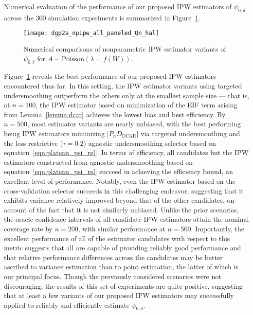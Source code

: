 Numerical evaluation of the performance of our proposed IPW estimators of
$\psi_{0,\delta}$ across the $300$ simulation experiments is summarized in
Figure~\ref{fig:dgp2a_npipw}.
\begin{figure}[H]
  \centering
  \texttt{[image: dgp2a\_npipw\_all\_paneled\_Qn\_hal]}
  \caption{Numerical comparisons of nonparametric IPW estimator variants of
       $\psi_{0,\delta}$ for $A \sim \text{Poisson}(\lambda = f(W))$.}
  \label{fig:dgp2a_npipw}
\end{figure}
Figure~\ref{fig:dgp2a_npipw} reveals the best performance of our proposed IPW
estimators encountered thus far. In this setting, the IPW estimator variants
using targeted undersmoothing outperform the others only at the smallest sample
size --- that is, at $n=100$, the IPW estimator based on minimization of the
EIF term arising from Lemma~\ref{lemma:dcar} achieves the lowest bias and best
efficiency. By $n=500$, most estimator variants are nearly unbiased, with the
best performing being IPW estimators minimizing $\lvert P_n D_\text{DCAR}
\rvert$ via targeted undersmoothing and the less restrictive ($\tau = 0.2$)
agnostic undersmoothing selector based on equation~\ref{eqn:plateau_psi_rel}. In
terms of efficiency, all candidates but the IPW estimators constructed from
agnostic undersmoothing based on equation~\ref{eqn:plateau_psi_rel} succeed in
achieving the efficiency bound, an excellent level of performance. Notably, even
the IPW estimator based on the cross-validation selector succeeds in this
challenging endeavor, suggesting that it exhibits variance relatively improved
beyond that of the other candidates, on account of the fact that it is not
similarly unbiased. Unlike the prior scenarios, the oracle confidence intervals
of all candidate IPW estimators attain the nominal coverage rate by $n=200$,
with similar performance at $n=500$. Importantly, the excellent performance of
all of the estimator candidates with respect to this metric suggests that all
are capable of providing reliably good performance and that relative performance
differences across the candidates may be better ascribed to variance estimation
than to point estimation, the latter of which is our principal focus. Though the
previously considered scenarios were not discouraging, the results of this set
of experiments are quite positive, suggesting that at least a few variants of
our proposed IPW estimators may successfully applied to reliably and efficiently
estimate $\psi_{0,\delta}$.

